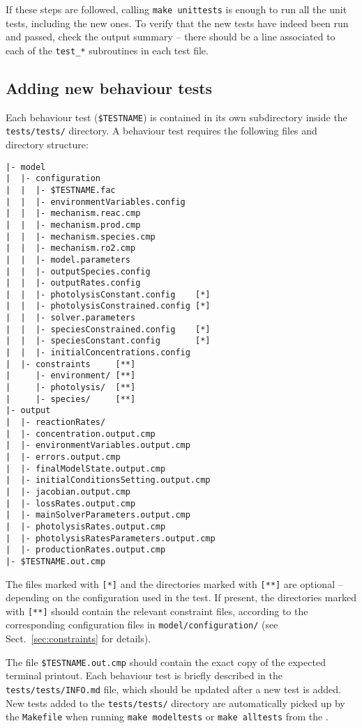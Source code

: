 If these steps are followed, calling \texttt{make\ unittests} is
enough to run all the unit tests, including the new ones. To verify
that the new tests have indeed been run and passed, check the output
summary -- there should be a line associated to each of the
\texttt{test\_*} subroutines in each test file.

\subsection{Adding new behaviour tests} \label{subsec:adding-new-behaviour-tests}

Each behaviour test (\texttt{\$TESTNAME}) is contained in its own
subdirectory inside the \texttt{tests/tests/} directory. A behaviour
test requires the following files and directory structure:

\begin{verbatim}
|- model
|  |- configuration
|  |  |- $TESTNAME.fac
|  |  |- environmentVariables.config
|  |  |- mechanism.reac.cmp
|  |  |- mechanism.prod.cmp
|  |  |- mechanism.species.cmp
|  |  |- mechanism.ro2.cmp
|  |  |- model.parameters
|  |  |- outputSpecies.config
|  |  |- outputRates.config
|  |  |- photolysisConstant.config    [*]
|  |  |- photolysisConstrained.config [*]
|  |  |- solver.parameters
|  |  |- speciesConstrained.config    [*]
|  |  |- speciesConstant.config       [*]
|  |  |- initialConcentrations.config
|  |- constraints     [**]
|     |- environment/ [**]
|     |- photolysis/  [**]
|     |- species/     [**]
|- output
|  |- reactionRates/
|  |- concentration.output.cmp
|  |- environmentVariables.output.cmp
|  |- errors.output.cmp
|  |- finalModelState.output.cmp
|  |- initialConditionsSetting.output.cmp
|  |- jacobian.output.cmp
|  |- lossRates.output.cmp
|  |- mainSolverParameters.output.cmp
|  |- photolysisRates.output.cmp
|  |- photolysisRatesParameters.output.cmp
|  |- productionRates.output.cmp
|- $TESTNAME.out.cmp
\end{verbatim}

The files marked with \texttt{[*]} and the directories marked with
\texttt{[**]} are optional -- depending on the configuration used in
the test. If present, the directories marked with \texttt{[**]} should
contain the relevant constraint files, according to the corresponding
configuration files in \texttt{model/configuration/} (see
Sect.~\ref{sec:constraints} for details).

The file \texttt{\$TESTNAME.out.cmp} should contain the exact copy of the
expected terminal printout. Each behaviour test is briefly described in the
\texttt{tests/tests/INFO.md} file, which should be updated after a new test is
added. New tests added to the \texttt{tests/tests/} directory are
automatically picked up by the \texttt{Makefile} when running
\verb|make modeltests| or \verb|make alltests| from the \maindir.

